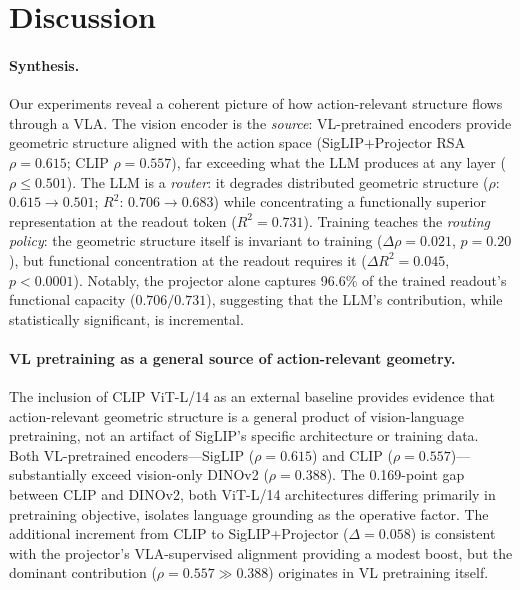 \section{Discussion}
\label{sec:discussion}

\paragraph{Synthesis.}
Our experiments reveal a coherent picture of how action-relevant structure flows through a VLA.
The vision encoder is the \emph{source}: VL-pretrained encoders provide geometric structure aligned with the action space (SigLIP+Projector RSA $\rho = 0.615$; CLIP $\rho = 0.557$), far exceeding what the LLM produces at any layer ($\rho \leq 0.501$).
The LLM is a \emph{router}: it degrades distributed geometric structure ($\rho$: $0.615 \to 0.501$; $R^2$: $0.706 \to 0.683$) while concentrating a functionally superior representation at the readout token ($R^2 = 0.731$).
Training teaches the \emph{routing policy}: the geometric structure itself is invariant to training ($\Delta\rho = 0.021$, $p = 0.20$), but functional concentration at the readout requires it ($\Delta R^2 = 0.045$, $p < 0.0001$).
Notably, the projector alone captures 96.6\% of the trained readout's functional capacity ($0.706/0.731$), suggesting that the LLM's contribution, while statistically significant, is incremental.

\paragraph{VL pretraining as a general source of action-relevant geometry.}
The inclusion of CLIP ViT-L/14 as an external baseline provides evidence that action-relevant geometric structure is a general product of vision-language pretraining, not an artifact of SigLIP's specific architecture or training data.
Both VL-pretrained encoders---SigLIP ($\rho = 0.615$) and CLIP ($\rho = 0.557$)---substantially exceed vision-only DINOv2 ($\rho = 0.388$).
The 0.169-point gap between CLIP and DINOv2, both ViT-L/14 architectures differing primarily in pretraining objective, isolates language grounding as the operative factor.
The additional increment from CLIP to SigLIP+Projector ($\Delta = 0.058$) is consistent with the projector's VLA-supervised alignment providing a modest boost, but the dominant contribution ($\rho = 0.557 \gg 0.388$) originates in VL pretraining itself.

